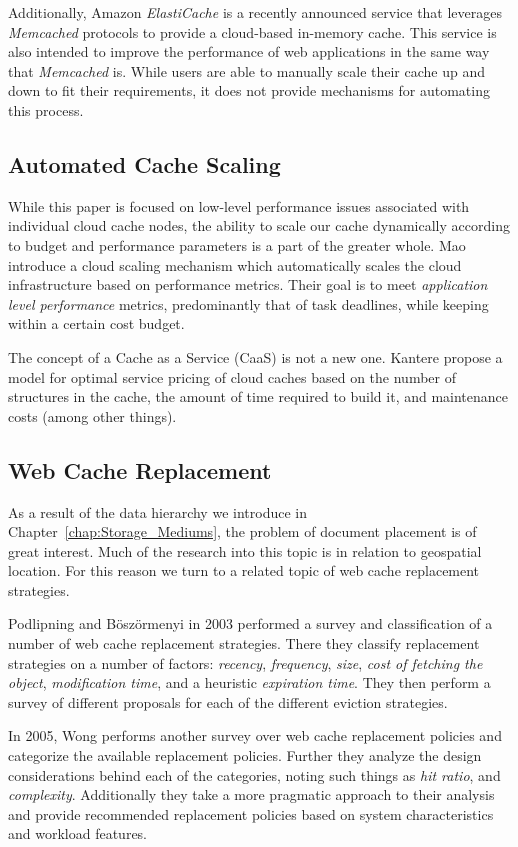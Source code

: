 Additionally, Amazon \emph{ElastiCache}\cite{amazonElastiCache} is a recently
announced service that leverages \emph{Memcached} protocols to provide a
cloud-based in-memory cache. This service is also intended to improve the
performance of web applications in the same way that \emph{Memcached} is. While
users are able to manually scale their cache up and down to fit their
requirements, it does not provide mechanisms for automating this process.

\subsection{Automated Cache Scaling}
While this paper is focused on low-level performance issues associated with
individual cloud cache nodes, the ability to scale our cache dynamically
according to budget and performance parameters is a part of the greater whole.
Mao \etal introduce a cloud scaling mechanism which automatically scales the
cloud infrastructure based on performance metrics\cite{cloud9}. Their goal is
to meet \emph{application level performance} metrics, predominantly that of
task deadlines, while keeping within a certain cost budget.

The concept of a Cache as a Service (CaaS) is not a new one.
Kantere \etal propose a model for optimal service pricing of cloud caches based
on the number of structures in the cache, the amount of time required to build
it, and maintenance costs (among other things).

\subsection{Web Cache Replacement}
As a result of the data hierarchy we introduce in
Chapter~\ref{chap:Storage_Mediums}, the problem of document placement is of
great interest. Much of the research into this topic is in relation to
geospatial location\cite{cloud6}. For this reason we turn to a related topic of
web cache replacement strategies.

Podlipning and B\"osz\"ormenyi in 2003 performed a survey and classification of
a number of web cache replacement strategies\cite{webcache1}. There they
classify replacement strategies on a number of factors: \emph{recency},
\emph{frequency}, \emph{size}, \emph{cost of fetching the object},
\emph{modification time}, and a heuristic \emph{expiration time}. They then
perform a survey of different proposals for each of the different eviction
strategies.

In 2005, Wong performs another survey over web cache replacement policies and
categorize the available replacement policies\cite{web_replacement_policies}.
Further they analyze the design considerations behind each of the categories,
noting such things as \emph{hit ratio}, and \emph{complexity}. Additionally
they take a more pragmatic approach to their analysis and provide recommended
replacement policies based on system characteristics and workload features.

